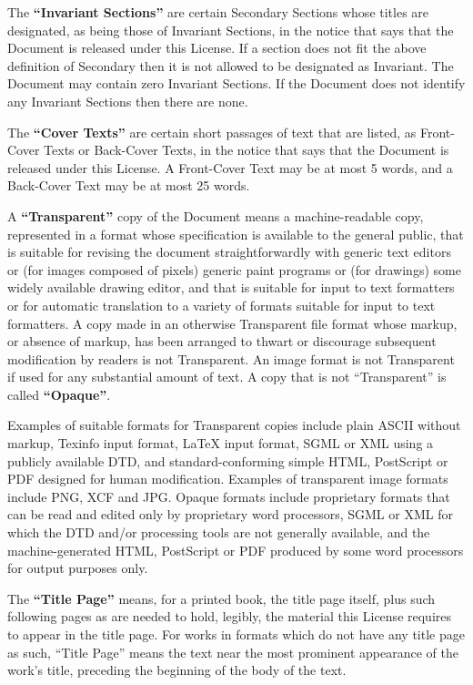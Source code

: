 The \textbf{``Invariant Sections''} are certain Secondary Sections whose titles are designated, as being those of Invariant Sections, in the notice that says that the Document is released under this License. If a section does not fit the above definition of Secondary then it is not allowed to be designated as Invariant. The Document may contain zero Invariant Sections. If the Document does not identify any Invariant Sections then there are none.

The \textbf{``Cover Texts''} are certain short passages of text that are listed, as Front-Cover Texts or Back-Cover Texts, in the notice that says that the Document is released under this License. A Front-Cover Text may be at most 5 words, and a Back-Cover Text may be at most 25 words.

A \textbf{``Transparent''} copy of the Document means a machine-readable copy, represented in a format whose specification is available to the general public, that is suitable for revising the document straightforwardly with generic text editors or (for images composed of pixels) generic paint programs or (for drawings) some widely available drawing editor, and that is suitable for input to text formatters or for automatic translation to a variety of formats suitable for input to text formatters. A copy made in an otherwise Transparent file format whose markup, or absence of markup, has been arranged to thwart or discourage subsequent modification by readers is not Transparent. An image format is not Transparent if used for any substantial amount of text. A copy that is not ``Transparent'' is called \textbf{``Opaque''}.

Examples of suitable formats for Transparent copies include plain ASCII without markup, Texinfo input format, LaTeX input format, SGML or XML using a publicly available DTD, and standard-conforming simple HTML, PostScript or PDF designed for human modification. Examples of transparent image formats include PNG, XCF and JPG. Opaque formats include proprietary formats that can be read and edited only by proprietary word processors, SGML or XML for which the DTD and/or processing tools are not generally available, and the machine-generated HTML, PostScript or PDF produced by some word processors for output purposes only.

The \textbf{``Title Page''} means, for a printed book, the title page itself, plus such following pages as are needed to hold, legibly, the material this License requires to appear in the title page. For works in formats which do not have any title page as such, ``Title Page'' means the text near the most prominent appearance of the work's title, preceding the beginning of the body of the text.

